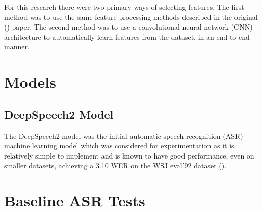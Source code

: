 For this research there were two primary ways of selecting features. The first method
was to use the same feature processing methods described in the original
(\cite{gaddy2020digital}) paper. The second method was to use a convolutional
neural network (CNN) architecture to automatically learn features from the
dataset, in an end-to-end manner.

\section{Models}

\subsection{DeepSpeech2 Model}

The DeepSpeech2 model was the initial automatic speech recognition (ASR) machine
learning model which was considered for experimentation as it is relatively simple to
implement and is known to have good performance, even on smaller datasets, achieving
a 3.10 WER on the WSJ eval'92 dataset
(\cite{DS2_original}).

\section{Baseline ASR Tests}